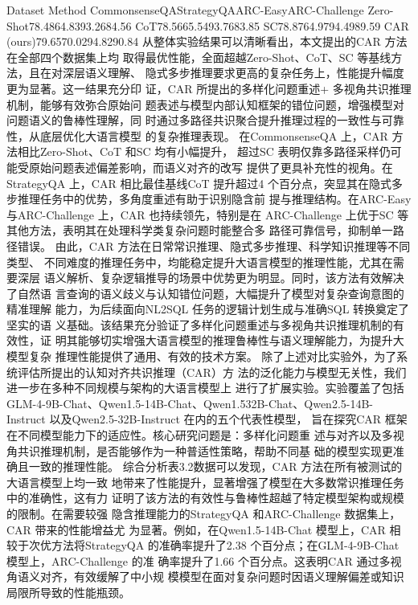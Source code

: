 \documentclass[12pt,a4paper,openright,UTF8]{ctexbook}
\begin{document}
Dataset Method CommonsenseQAStrategyQAARC-EasyARC-Challenge Zero-Shot78.4864.8393.2684.56 CoT78.5665.5493.7683.85 SC78.8764.9794.4989.59 CAR (ours)79.6570.0294.8290.84 从整体实验结果可以清晰看出，本文提出的CAR 方法在全部四个数据集上均 取得最优性能，全面超越Zero-Shot、CoT、SC 等基线方法，且在对深层语义理解、 隐式多步推理要求更高的复杂任务上，性能提升幅度更为显著。这一结果充分印 证，CAR 所提出的多样化问题重述+ 多视角共识推理机制，能够有效弥合原始问 题表述与模型内部认知框架的错位问题，增强模型对问题语义的鲁棒性理解，同 时通过多路径共识聚合提升推理过程的一致性与可靠性，从底层优化大语言模型 的复杂推理表现。 在CommonsenseQA 上，CAR 方法相比Zero-Shot、CoT 和SC 均有小幅提升， 超过SC 表明仅靠多路径采样仍可能受原始问题表述偏差影响，而语义对齐的改写 提供了更具补充性的视角。在StrategyQA 上，CAR 相比最佳基线CoT 提升超过4 个百分点，突显其在隐式多步推理任务中的优势，多角度重述有助于识别隐含前 提与推理结构。在ARC-Easy 与ARC-Challenge 上，CAR 也持续领先，特别是在 ARC-Challenge 上优于SC 等其他方法，表明其在处理科学类复杂问题时能整合多 路径可靠信号，抑制单一路径错误。 由此，CAR 方法在日常常识推理、隐式多步推理、科学知识推理等不同类型、 不同难度的推理任务中，均能稳定提升大语言模型的推理性能，尤其在需要深层 语义解析、复杂逻辑推导的场景中优势更为明显。同时，该方法有效解决了自然语 言查询的语义歧义与认知错位问题，大幅提升了模型对复杂查询意图的精准理解 能力，为后续面向NL2SQL 任务的逻辑计划生成与准确SQL 转换奠定了坚实的语 义基础。该结果充分验证了多样化问题重述与多视角共识推理机制的有效性，证 明其能够切实增强大语言模型的推理鲁棒性与语义理解能力，为提升大模型复杂 推理性能提供了通用、有效的技术方案。 除了上述对比实验外，为了系统评估所提出的认知对齐共识推理（CAR）方 法的泛化能力与模型无关性，我们进一步在多种不同规模与架构的大语言模型上 进行了扩展实验。实验覆盖了包括GLM-4-9B-Chat、Qwen1.5-14B-Chat、Qwen1.532B-Chat、Qwen2.5-14B-Instruct 以及Qwen2.5-32B-Instruct 在内的五个代表性模型， 旨在探究CAR 框架在不同模型能力下的适应性。核心研究问题是：多样化问题重 述与对齐以及多视角共识推理机制，是否能够作为一种普适性策略，帮助不同基 础的模型实现更准确且一致的推理性能。 综合分析表3.2数据可以发现，CAR 方法在所有被测试的大语言模型上均一致 地带来了性能提升，显著增强了模型在大多数常识推理任务中的准确性，这有力 证明了该方法的有效性与鲁棒性超越了特定模型架构或规模的限制。在需要较强 隐含推理能力的StrategyQA 和ARC-Challenge 数据集上，CAR 带来的性能增益尤 为显著。例如，在Qwen1.5-14B-Chat 模型上，CAR 相较于次优方法将StrategyQA 的准确率提升了2.38 个百分点；在GLM-4-9B-Chat 模型上，ARC-Challenge 的准 确率提升了1.66 个百分点。这表明CAR 通过多视角语义对齐，有效缓解了中小规 模模型在面对复杂问题时因语义理解偏差或知识局限所导致的性能瓶颈。
\end{document}
